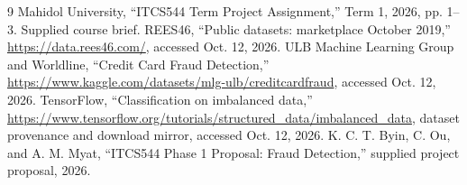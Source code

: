 \documentclass[conference]{IEEEtran}
\begin{document}
\begin{thebibliography}{9}
 Mahidol University, ``ITCS544 Term Project Assignment,'' Term 1, 2026, pp. 1--3. Supplied course brief.
 REES46, ``Public datasets: marketplace October 2019,'' \url{https://data.rees46.com/}, accessed Oct. 12, 2026.
 ULB Machine Learning Group and Worldline, ``Credit Card Fraud Detection,'' \url{https://www.kaggle.com/datasets/mlg-ulb/creditcardfraud}, accessed Oct. 12, 2026.
 TensorFlow, ``Classification on imbalanced data,'' \url{https://www.tensorflow.org/tutorials/structured_data/imbalanced_data}, dataset provenance and download mirror, accessed Oct. 12, 2026.
 K. C. T. Byin, C. Ou, and A. M. Myat, ``ITCS544 Phase 1 Proposal: Fraud Detection,'' supplied project proposal, 2026.
\end{thebibliography}
\end{document}
